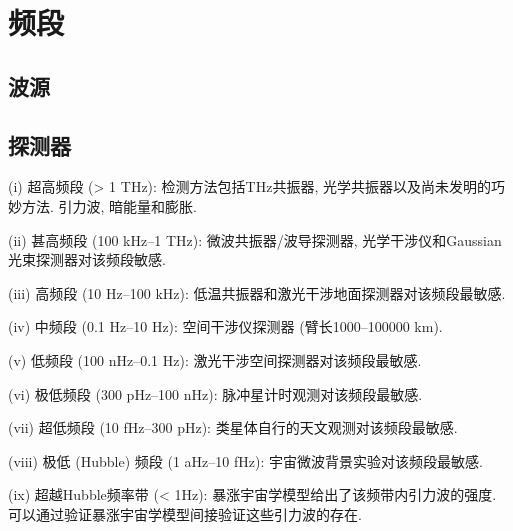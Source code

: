 \chapter{频段}

\section{波源}

\cite{王2020,Sathyaprakash2009,Aggarwal2021,Fryer2011,Romano2017,Schutz1999,Cutler2002,Riles2013}

\section{探测器}

\cite{王2020,Ni2010}

(i) 超高频段 (> 1 THz): 检测方法包括THz共振器, 光学共振器以及尚未发明的巧妙方法. 引力波, 暗能量和膨胀. 

(ii) 甚高频段 (100 kHz--1 THz): 微波共振器/波导探测器, 光学干涉仪和Gaussian光束探测器对该频段敏感. 

(iii) 高频段 (10 Hz--100 kHz): 低温共振器和激光干涉地面探测器对该频段最敏感. 

(iv) 中频段 (0.1 Hz--10 Hz): 空间干涉仪探测器 (臂长1000--100000 km). 

(v) 低频段 (100 nHz--0.1 Hz): 激光干涉空间探测器对该频段最敏感. 

(vi) 极低频段 (300 pHz--100 nHz): 脉冲星计时观测对该频段最敏感. 

(vii) 超低频段 (10 fHz--300 pHz): 类星体自行的天文观测对该频段最敏感. 

(viii) 极低 (Hubble) 频段 (1 aHz--10 fHz): 宇宙微波背景实验对该频段最敏感.

(ix) 超越Hubble频率带 (< 1Hz): 暴涨宇宙学模型给出了该频带内引力波的强度. 可以通过验证暴涨宇宙学模型间接验证这些引力波的存在. 

